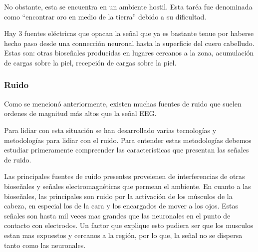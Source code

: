 \documentclass[11pt]{article}
\begin{document}
No obstante, esta se encuentra en un ambiente hostil. Esta taréa fue denominada como “encontrar oro en medio de la tierra” debido a su dificultad.

Hay 3 fuentes eléctricas que opacan la señal que ya es bastante tenue por haberse hecho paso desde una connección neuronal hasta la superficie del cuero cabelludo. Estas son: otras bioseñales producidas en lugares cercanos a la zona, acumulación de cargas sobre la piel, recepción de cargas sobre la piel.

\subsubsection{Ruido}
\label{sec:org1398eaa}
Como se mencionó anteriormente, existen muchas fuentes de ruido que suelen ordenes de magnitud más altos que la señal EEG.

Para lidiar con esta situación se han desarrollado varias tecnologías y metodologías para lidiar con el ruido. Para entender estas metodologías debemos estudiar primeramente compreender las características que presentan las señales de ruido.

Las principales fuentes de ruido presentes proveienen de interferencias de otras bioseñales y señales electromagnéticas que permean el ambiente. En cuanto a las bioseñales, las principales son ruido por la activación de los músculos de la cabeza, en especial los de la cara y los encargados de mover a los ojos. Estas señales son hasta mil veces mas grandes que las neuronales en el punto de contacto con electrodos. Un factor que explique esto pudiera ser que los musculos estan mas expuestos y cercanos a la región, por lo que, la señal no se dispersa tanto como las neuronales.
\end{document}
